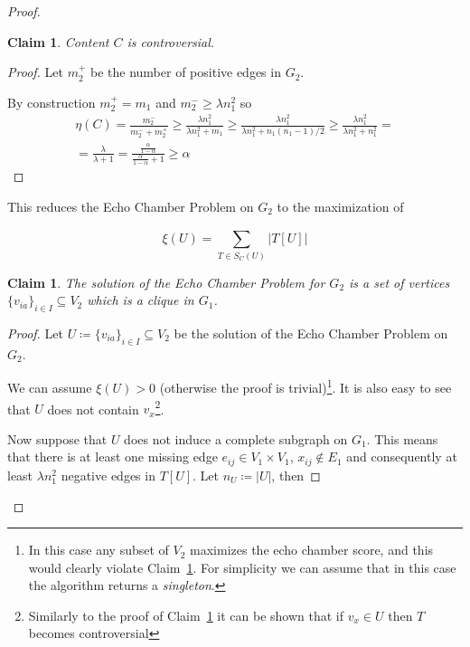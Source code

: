 \documentclass{article}
\newtheorem{claim}[theorem]{Claim}
\begin{document}
\begin{proof}
	\begin{claim}
		\label{th:claim-controversial}
		Content $C$ is controversial.
	\end{claim}
	\begin{proof}
		Let $m_{2}^{+} $ be the number of positive edges in $G_{2} $.

		By construction $m_{2}^{+} = m _{1} $ and $m_{2}^{-} \geq
			\lambda n_{1}^{2}  $ so
		\begin{align}
			\eta(C) = \frac{m_{2}^{-} }{m_{2}^{-} +
				m_{2}^{+} } \geq \frac{\lambda n_{1}^{2}}{\lambda n_{1}^{2}
				+ m_{1} } \geq \frac{\lambda n_{1}^{2}}{\lambda n_{1}^{2}
				+ n_{1}(n _{1} -1 )/2  } \geq \frac{\lambda n_{1}^{2}}{\lambda n_{1}^{2}
			+ n_{1}^{2} } = \\
			= \frac{\lambda }{\lambda + 1} =
			\frac{ \frac{\alpha }{1 - \alpha }  }{ \frac{\alpha }{1 - \alpha }
				+ 1 } \geq \alpha
		\end{align}
	\end{proof}

	This reduces the Echo Chamber Problem on $G_2$ to the maximization of

	\begin{equation}
		\label{eq:score}
		\xi(U) = \sum^{}_{T \in S_{C}(U) } | T[U] |
	\end{equation}

	\begin{claim}
		\label{th:claim-complete}
		The solution of the Echo Chamber Problem for $G_2$ is a set of vertices
		$\{ v_{ia} \} _{i \in I}  \subseteq V_{2} $ which is a clique
		in $G_{1} $.
	\end{claim}

	\begin{proof}
		Let $U \coloneqq \{ v_{ia} \} _{i \in I}  \subseteq V_{2} $ be the
		solution of the Echo Chamber Problem on $G_2$.

		We can assume $\xi(U) > 0$ (otherwise the proof is
		trivial)\footnote{In this case any subset of $V_{2} $ maximizes the echo
			chamber score, and this would clearly
			violate Claim~\ref{th:claim-complete}. For simplicity we can
			assume that in this case the algorithm returns a
			\emph{singleton}.}.
		It is also easy to see that $U$ does not contain $v_x$\footnote{Similarly
			to the proof of Claim~\ref{th:claim-controversial} it can be shown
			that if $v_x \in U$ then $T$ becomes controversial}.

		Now suppose that $U$ does not induce a complete subgraph on $G_1$. This
		means that there is at least one missing edge $e_{ij} \in V_1 \times
			V_1 $, $x_{ij} \not\in E_1$ and consequently at
		least $\lambda n^{2}_{1}  $ negative edges in $T[U]$. Let $n_U
			\coloneqq |U|$, then


\end{proof}
\end{proof}
\end{document}
